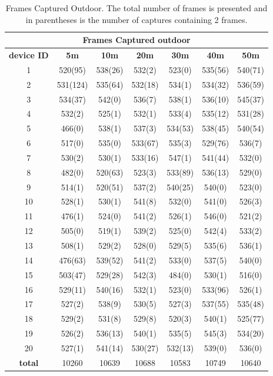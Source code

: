 \documentclass[a4paper, 12pt]{article}
\begin{document}
\begin{table}[H]
  \caption{Frames Captured Outdoor. The total number of frames is presented and in parentheses is the number of captures containing 2 frames.}\label{tab:outdoor}
  \begin{center}
    \begin{tabular}{|c|c|c|c|c|c|c|}
      \hline
      \multicolumn{7}{|c|}{\textbf{Frames Captured outdoor}} \\
      \hline
      \textbf{device ID} & \textbf{5\unit{\m}} & \textbf{10\unit{\m}} & \textbf{20\unit{\m}} & \textbf{30\unit{\m}} & \textbf{40\unit{\m}} & \textbf{50\unit{\m}}\\
      \hline
1& 520(95)&538(26)&532(2)&523(0)&535(56)&540(71)
\\ \hline
2& 531(124)&535(64)&532(18)&534(1)&534(32)&536(59)
\\ \hline
3& 534(37)&542(0)&536(7)&538(1)&536(10)&545(37)
\\ \hline
4& 532(2)&525(1)&532(1)&533(4)&535(12)&531(28)
\\ \hline
5& 466(0)&538(1)&537(3)&534(53)&538(45)&540(54)
\\ \hline
6& 517(0)&535(0)&533(67)&535(3)&529(76)&536(7)
\\ \hline
7& 530(2)&530(1)&533(16)&547(1)&541(44)&532(0)
\\ \hline
8& 482(0)&520(63)&523(3)&533(89)&536(13)&529(0)
\\ \hline
9& 514(1)&520(51)&537(2)&540(25)&540(0)&523(0)
\\ \hline
10& 528(1)&530(1)&541(8)&532(0)&541(0)&526(3)
\\ \hline
11& 476(1)&524(0)&541(2)&526(1)&546(0)&521(2)
\\ \hline
12& 505(0)&519(1)&539(2)&525(0)&542(4)&533(2)
\\ \hline
13& 508(1)&529(2)&528(0)&529(5)&535(6)&536(1)
\\ \hline
14& 476(63)&539(52)&541(2)&533(0)&537(5)&540(0)
\\ \hline
15& 503(47)&529(28)&542(3)&484(0)&530(1)&516(0)
\\ \hline
16& 529(11)&540(16)&532(1)&523(0)&533(96)&526(1)
\\ \hline
17& 527(2)&538(9)&530(5)&527(3)&537(55)&535(48)
\\ \hline
18& 529(2)&531(8)&529(8)&520(3)&540(1)&525(77)
\\ \hline
19& 526(2)&536(13)&540(1)&535(5)&545(3)&534(20)
\\ \hline
20& 527(1)&541(14)&530(27)&532(13)&539(0)&536(0)
\\ \hline
      \hline
      \textbf{total} & 10260&10639&10688&10583&10749&10640 \\
      \hline
    \end{tabular}
  \end{center}
\end{table}
\end{document}
